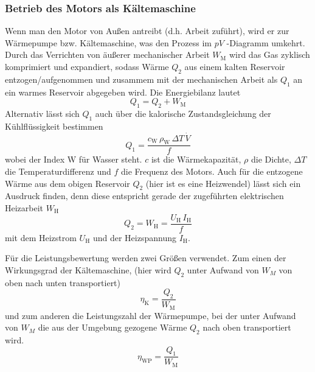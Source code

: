 \subsubsection{Betrieb des Motors als Kältemaschine} \label{ssec:SterKa}
Wenn man den Motor von Außen antreibt (d.h. Arbeit zuführt), wird er zur Wärmepumpe bzw. Kältemaschine, was den Prozess im \(pV\) -Diagramm umkehrt.
Durch das Verrichten von äußerer mechanischer Arbeit \(W_\text{M}\) wird das Gas zyklisch komprimiert und expandiert, sodass Wärme \(Q_2\) aus einem kalten Reservoir entzogen/aufgenommen und zusammem mit der mechanischen Arbeit als \(Q_1\) an ein warmes Reservoir abgegeben wird. Die Energiebilanz lautet
\begin{equation}
    \label{Kaelte}
    Q_1 = Q_2 + W_\mathrm{M}
\end{equation}
Alternativ lässt sich \(Q_1\) auch über die kalorische Zustandsgleichung der Kühlflüssigkeit bestimmen
\begin{equation}
    \label{eq:mit_ordentlich_kalorien}
    Q_1 = \frac{c_\text{W} \, \rho_\text{W} \, \Delta T \, \dot V}{f} 
\end{equation}
wobei der Index W für Wasser steht. \(c\) ist die Wärmekapazität, \(\rho\) die Dichte, \(\Delta T\) die Temperaturdifferenz und \(f\) die Frequenz des Motors.
Auch für die entzogene Wärme aus dem obigen Reservoir \(Q_2\) (hier ist es eine Heizwendel) lässt sich ein Ausdruck finden, denn diese entspricht gerade der zugeführten elektrischen Heizarbeit \(W_\text{H}\)
\begin{equation}
    \label{qZWEI_ist_es_diesessmalalasdhj}
    Q_2 = W_\text{H} = \frac{U_\text{H} \, I_\text{H}}{f} 
\end{equation}
mit dem Heizstrom \(U_\text{H}\) und der Heizspannung \(I_\text{H}\).

Für die Leistungsbewertung werden zwei Größen verwendet. Zum einen der Wirkungsgrad der Kältemaschine, (hier wird \(Q_2\) unter Aufwand von \(W_M\) von oben nach unten transportiert) 
\begin{equation}
    \label{nK}
    \eta_\mathrm{K} = \frac{Q_2}{W_\mathrm{M}} 
\end{equation}
und zum anderen die Leistungszahl der Wärmepumpe, bei der unter Aufwand von \(W_M\) die aus der Umgebung gezogene Wärme \(Q_2\) nach oben transportiert wird.  
\begin{equation}
    \label{WP}
    \eta_\mathrm{WP} = \frac{Q_1}{W_\mathrm{M}} 
\end{equation}


